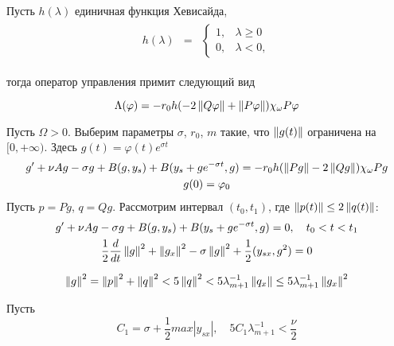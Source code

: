 \begin{remark}
    Пусть $h(\lambda)$ единичная функция Хевисайда, \\
    \begin{gather*}
        \begin{matrix}
            h(\lambda) & =
            & \left\{
            \begin{matrix}
                1, & \lambda \ge 0 \\
                0, & \lambda < 0, 
            \end{matrix} \right.
        \end{matrix}
    \end{gather*}

    тогда оператор управления примит следующий вид

    \begin{equation}
        \Lambda(\varphi) = -r_0 h(-2\left\lVert Q\varphi\right\rVert +
        \left\lVert P\varphi\right\rVert)\chi_{\omega}P\varphi
    \end{equation}

\end{remark}


    Пусть $\Omega > 0$. Выберим параметры $\sigma$, $r_0$, $m$ такие, что
    $\left\lVert g(t)\right\rVert$ ограничена на $[0, +\infty)$. Здесь $g(t) = \varphi(t)e^{\sigma t}$
    \begin{gather*}
        g' + \nu Ag - \sigma g + B(g, y_s) + B(y_s + ge^{-\sigma t}, g) = -r_0 
        h(\left\lVert Pg\right\rVert - 2 \left\lVert Qg\right\rVert) \chi_{\omega}Pg\\*
        g(0) = \varphi_0
    \end{gather*}
    Пусть $p = Pg$, $q = Qg$. Рассмотрим интервал $(t_0, t_1)$, где $\left\lVert p(t)\right\rVert
    \le 2 \left\lVert q(t)\right\rVert$:
    \begin{gather*}
        g' + \nu Ag - \sigma g + B(g, y_s) + B(y_s + ge^{-\sigma t}, g) = 0, \quad
        t_0 < t < t_1\\
        \frac{1}{2}\frac{d}{dt}\left\lVert g\right\rVert^2 + \left\lVert g_x\right\rVert^2 - \sigma \left\lVert g\right\rVert^2 +
        \frac{1}{2}(y_{sx}, g^2) = 0
    \end{gather*}

    \begin{gather*}
        \left\lVert g\right\rVert^2 = \left\lVert p\right\rVert^2 + \left\lVert q\right\rVert^2 < 5\left\lVert q\right\rVert^2 < 5\lambda^{-1}_{m +
        1}\left\lVert q_x\right\rVert \le 5 \lambda^{-1}_{m + 1}\left\lVert g_x\right\rVert^2
    \end{gather*}

    Пусть 
    \begin{equation}
        C_1 = \sigma + \frac{1}{2}max|y_{sx}|, \quad 5C_1\lambda^{-1}_{m + 1} <
        \frac{\nu}{2}
    \end{equation}

